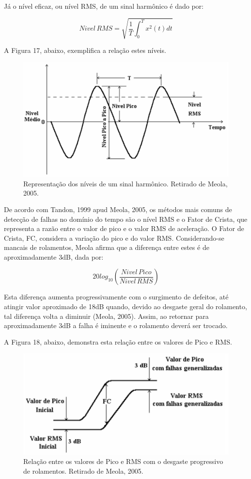 \documentclass[
	12pt,				
	oneside,			
	a4paper,			
	english,			
	brazil				
	]{abntex2ppgsi}
\begin{document}
Já o nível eficaz, ou nível RMS, de um sinal harmônico é dado por:

\[Nivel \, RMS = \sqrt{ \frac{1}{T} \int_{0}^{T} x^{2}(t)dt }  \]

A Figura 17, abaixo, exemplifica a relação estes níveis.

\begin{figure}[!htb]
\centering
\includegraphics{Figura17}
\caption {Representação dos níveis de um sinal harmônico. Retirado de Meola, 2005.}
\label{Figura17}
\end{figure}

De acordo com Tandon, 1999 apud Meola, 2005, os métodos mais comuns de detecção de falhas no domínio do tempo são o nível RMS e o Fator de Crista, que representa a razão entre o valor de pico e o valor RMS de aceleração. O Fator de Crista, FC, considera a variação do pico e do valor RMS. Considerando-se mancais de rolamentos, Meola afirma que a diferença entre estes é de aproximadamente 3dB, dada por:

\[20log_{10} \left ( \frac{Nivel \,Pico}{Nivel \, RMS} \right ) \]

Esta diferença aumenta progressivamente com o surgimento de defeitos, até atingir valor aproximado de 18dB quando, devido ao desgaste geral do rolamento, tal diferença volta a diminuir (Meola, 2005). Assim, ao retornar para aproximadamente 3dB a falha é iminente e o rolamento deverá ser trocado. 

A Figura 18, abaixo, demonstra esta relação entre os valores de Pico e RMS.  

\begin{figure}[!htb]
\centering
\includegraphics{Figura18}
\caption {Relação entre os valores de Pico e RMS com o desgaste progressivo de rolamentos. Retirado de Meola, 2005.}
\label{Figura18}
\end{figure}	
\end{document}

